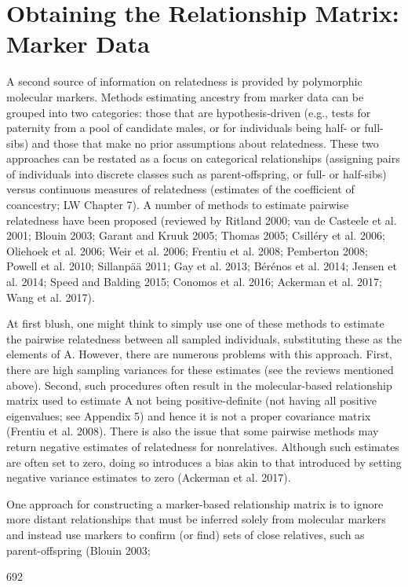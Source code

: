 \documentclass{article}
\begin{document}
\section{Obtaining the Relationship Matrix: Marker Data}
A second source of information on relatedness is provided by polymorphic molecular markers. Methods estimating ancestry from marker data can be grouped into two categories: those that are hypothesis-driven (e.g., tests for paternity from a pool of candidate males, or for individuals being half- or full-sibs) and those that make no prior assumptions about relatedness. These two approaches can be restated as a focus on categorical relationships (assigning pairs of individuals into discrete classes such as parent-offspring, or full- or half-sibs) versus continuous measures of relatedness (estimates of the coefficient of coancestry; LW Chapter 7). A number of methods to estimate pairwise relatedness have been proposed (reviewed by Ritland 2000; van de Casteele et al. 2001; Blouin 2003; Garant and Kruuk 2005; Thomas 2005; Csilléry et al. 2006; Oliehoek et al. 2006; Weir et al. 2006; Frentiu et al. 2008; Pemberton 2008; Powell et al. 2010; Sillanpää 2011; Gay et al. 2013; Bérénos et al. 2014; Jensen et al. 2014; Speed and Balding 2015; Conomos et al. 2016; Ackerman et al. 2017; Wang et al. 2017).

At first blush, one might think to simply use one of these methods to estimate the pairwise relatedness between all sampled individuals, substituting these as the elements of A. However, there are numerous problems with this approach. First, there are high sampling variances for these estimates (see the reviews mentioned above). Second, such procedures often result in the molecular-based relationship matrix used to estimate A not being positive-definite (not having all positive eigenvalues; see Appendix 5) and hence it is not a proper covariance matrix (Frentiu et al. 2008). There is also the issue that some pairwise methods may return negative estimates of relatedness for nonrelatives. Although such estimates are often set to zero, doing so introduces a bias akin to that introduced by setting negative variance estimates to zero (Ackerman et al. 2017).

One approach for constructing a marker-based relationship matrix is to ignore more distant relationships that must be inferred solely from molecular markers and instead use markers to confirm (or find) sets of close relatives, such as parent-offspring (Blouin 2003;

692
\end{document}
